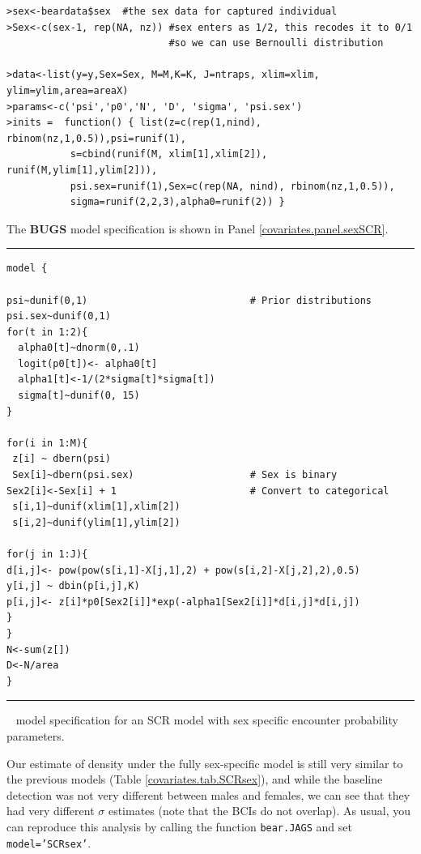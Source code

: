 {\small
\begin{verbatim}
>sex<-beardata$sex  #the sex data for captured individual
>Sex<-c(sex-1, rep(NA, nz)) #sex enters as 1/2, this recodes it to 0/1
                            #so we can use Bernoulli distribution 

>data<-list(y=y,Sex=Sex, M=M,K=K, J=ntraps, xlim=xlim, ylim=ylim,area=areaX)
>params<-c('psi','p0','N', 'D', 'sigma', 'psi.sex')
>inits =  function() { list(z=c(rep(1,nind), rbinom(nz,1,0.5)),psi=runif(1), 
           s=cbind(runif(M, xlim[1],xlim[2]), runif(M,ylim[1],ylim[2])),
           psi.sex=runif(1),Sex=c(rep(NA, nind), rbinom(nz,1,0.5)), 
           sigma=runif(2,2,3),alpha0=runif(2)) }
\end{verbatim}
}
{\flushleft The} {\bf BUGS} model specification is shown in Panel 
\ref{covariates.panel.sexSCR}.

 
\begin{panel}[htp]
\centering
\rule[0.1in]{\textwidth}{.03in}
{\small
\begin{verbatim}
model {

psi~dunif(0,1)                            # Prior distributions
psi.sex~dunif(0,1)
for(t in 1:2){                             
  alpha0[t]~dnorm(0,.1)
  logit(p0[t])<- alpha0[t]
  alpha1[t]<-1/(2*sigma[t]*sigma[t])
  sigma[t]~dunif(0, 15)
}

for(i in 1:M){
 z[i] ~ dbern(psi)
 Sex[i]~dbern(psi.sex)                    # Sex is binary
Sex2[i]<-Sex[i] + 1                       # Convert to categorical
 s[i,1]~dunif(xlim[1],xlim[2])
 s[i,2]~dunif(ylim[1],ylim[2])

for(j in 1:J){
d[i,j]<- pow(pow(s[i,1]-X[j,1],2) + pow(s[i,2]-X[j,2],2),0.5)
y[i,j] ~ dbin(p[i,j],K)
p[i,j]<- z[i]*p0[Sex2[i]]*exp(-alpha1[Sex2[i]]*d[i,j]*d[i,j])
}
}
N<-sum(z[])
D<-N/area
}
\end{verbatim}
}

\rule[-0.1in]{\textwidth}{.03in}
\caption{
\jags~ model specification for an SCR model with sex specific 
encounter probability parameters.}
\label{covariates.panel.SCRsex}
\end{panel}

Our estimate of density under the fully sex-specific model is still
very similar to the previous models (Table
\ref{covariates.tab.SCRsex}), and while the baseline detection was not
very different between males and females, we can see that they had
very different $\sigma$ estimates (note that the BCIs do not overlap).
As usual, you can reproduce this analysis by calling the function 
{\tt bear.JAGS} and set {\tt model='SCRsex'}.


